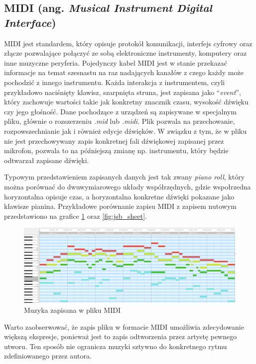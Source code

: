 \documentclass[data-science]{agh-wi} %
\begin{document}
\subsection{MIDI (ang. \textit{Musical Instrument Digital Interface})}
MIDI jest standardem, który opisuje protokół komunikacji, interfejs cyfrowy oraz złącze pozwalające połączyć ze sobą elektroniczne instrumenty, komputery oraz inne muzyczne peryferia. Pojedynczy kabel MIDI jest w stanie przekazać informacje na temat szesnastu na raz nadających kanałów z czego każdy może pochodzić z innego instrumentu. Każda interakcja z instrumentem, czyli przykładowo naciśnięty klawisz, szarpnięta struna, jest zapisana jako ``\textit{event}'', który zachowuje wartości takie jak konkretny znacznik czasu, wysokość dźwięku czy jego głośność. Dane pochodzące z urządzeń są zapisywane w specjalnym pliku, głównie o rozszerzeniu \textit{.mid} lub \textit{.midi}. Plik pozwala na przechowanie, rozpowszechnianie jak i również edycje dźwięków. W związku z tym, że w pliku nie jest przechowywany zapis konkretnej fali dźwiękowej zapisanej przez mikrofon, pozwala to na późniejszą zmianę np. instrumentu, który będzie odtwarzał zapisane dźwięki.

Typowym przedstawieniem zapisanych danych jest tak zwany \textit{piano roll}, który można porównać do dwuwymiarowego układy współrzędnych, gdzie wspołrzedna horyzontalna opisuje czas, a horyzontalna konkretne dźwięki pokazane jako klawisze pianina. Przykładowe porównanie zapisu MIDI z zapisem nutowym przedstawiono na grafice \ref*{fig:jsb_pianoroll} oraz \ref*{fig:jsb_sheet}.

\begin{figure}[ht!]
    \begin{center}
        \includegraphics*[width=\linewidth]{./img/piano_roll.png}
    \end{center}
    \caption{Muzyka zapisana w pliku MIDI}\label{fig:jsb_pianoroll}
\end{figure}

Warto zaobserwować, że zapis pliku w formacie MIDI umożliwia zdecydowanie większą ekspresje, ponieważ jest to zapis odtworzenia przez artystę pewnego utworu. Ten sposób nie ogranicza muzyki sztywno do konkretnego rytmu zdefiniowanego przez autora.
\end{document}
